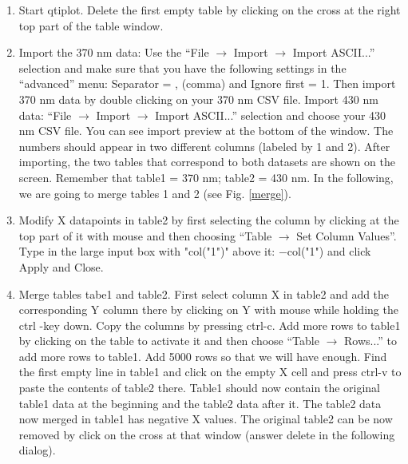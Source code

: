 \documentclass[byrevtex,amssymb,aps,pra,floatfix,letterpaper]{revtex4}
\begin{document}
\begin{enumerate}
\item Start qtiplot. Delete the first empty table by clicking on the cross at the right top part of the table window.

\item Import the 370 nm data: Use the ``File $\rightarrow$ Import $\rightarrow$ Import ASCII...'' selection and
make sure that you have the following settings in the ``advanced'' menu: Separator = , (comma) and Ignore first = 1.
Then import 370 nm data by double clicking on your 370 nm CSV file. Import 430 nm data: ``File $\rightarrow$ Import $\rightarrow$ Import ASCII...'' selection and choose your 430 nm CSV file. You can see import preview at the bottom of the window. The numbers should appear in two different columns (labeled by 1 and 2). After importing, the two tables that correspond to both datasets are shown on the screen. Remember that table1 = 370 nm; table2 = 430 nm. In the following, we are going to merge tables 1 and 2 (see Fig. \ref{merge}).

\item Modify X datapoints in table2 by first selecting the column by clicking at the top part of it with mouse and then choosing ``Table $\rightarrow$ Set Column Values''. Type in the large input box with "col("1")" above it: $-$col("1") and click Apply and Close.

\item Merge tables tabe1 and table2. First select column X in table2 and add the corresponding Y column there by clicking on Y with mouse while holding the ctrl -key down. Copy the columns by pressing ctrl-c. Add more rows to table1 by clicking on the table to activate it and then choose ``Table $\rightarrow$ Rows...'' to add more rows to table1. Add 5000 rows so that we will have enough. Find the first empty line in table1 and click on the empty X cell and press ctrl-v to paste the contents of table2 there. Table1 should now contain the original table1 data at the beginning and the table2 data after it. The table2 data now merged in table1 has negative X values. The original table2 can be now removed by click on the cross at that window (answer delete in the following dialog).


\end{enumerate}
\end{document}
